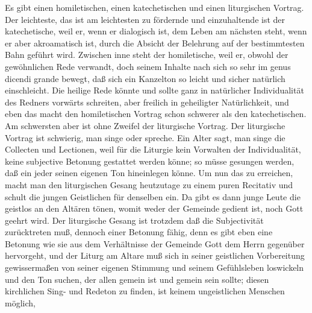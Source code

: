 Es gibt einen homiletischen, einen katechetischen und einen liturgischen Vortrag. Der leichteste, das ist am leichtesten zu fördernde und einzuhaltende ist der katechetische, weil er, wenn er dialogisch ist, dem Leben am nächsten steht, wenn er aber akroamatisch ist, durch die Absicht der Belehrung auf der
bestimmtesten Bahn geführt wird. Zwischen inne steht der homiletische, weil er, obwohl der gewöhnlichen Rede verwandt, doch seinem Inhalte nach sich so sehr im genus dicendi grande bewegt, daß sich ein Kanzelton so leicht und sicher natürlich einschleicht. Die heilige Rede könnte und sollte ganz in natürlicher Individualität des Redners vorwärts schreiten, aber freilich in geheiligter Natürlichkeit, und eben das macht den homiletischen Vortrag schon schwerer als den katechetischen. Am schwersten aber ist ohne Zweifel der liturgische Vortrag. Der liturgische Vortrag ist schwierig, man singe oder spreche. Ein Alter sagt, man singe die Collecten und Lectionen, weil für die Liturgie kein Vorwalten der Individualität, keine subjective Betonung gestattet werden könne; so müsse gesungen werden, daß ein jeder seinen eigenen Ton hineinlegen könne. Um nun das zu erreichen, macht man den liturgischen Gesang heutzutage zu einem puren Recitativ und schult die jungen Geistlichen für denselben ein. Da gibt es dann junge Leute die geistlos an den Altären tönen, womit weder der Gemeinde gedient ist, noch Gott geehrt wird. Der liturgische Gesang ist trotzdem daß die Subjectivität zurücktreten muß, dennoch einer Betonung fähig, denn es gibt eben eine Betonung wie sie aus dem Verhältnisse der Gemeinde Gott dem Herrn gegenüber hervorgeht, und der Liturg am Altare muß sich in seiner geistlichen Vorbereitung gewissermaßen von seiner eigenen Stimmung und seinem Gefühlsleben loswickeln und den Ton suchen, der allen gemein ist und gemein sein sollte; diesen kirchlichen Sing- und Redeton zu finden, ist keinem ungeistlichen Menschen möglich,
